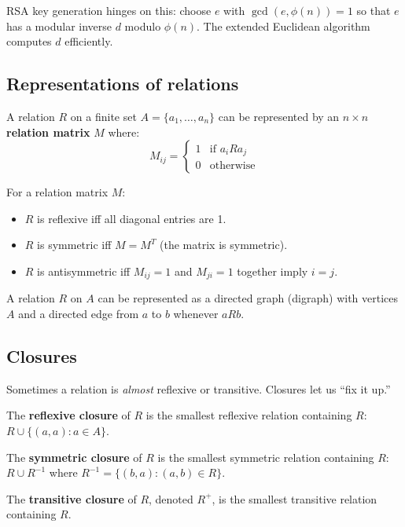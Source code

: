 \begin{remark}
RSA key generation hinges on this: choose $e$ with $\gcd(e,\phi(n)) = 1$ so that $e$ has a modular inverse $d$ modulo $\phi(n)$. The extended Euclidean algorithm computes $d$ efficiently.
\end{remark}

\subsection*{Representations of relations}

\begin{definition}
A relation $R$ on a finite set $A = \{a_1, \ldots, a_n\}$ can be represented by an $n \times n$ \textbf{relation matrix} $M$ where:
\[
M_{ij} = \begin{cases} 1 & \text{if } a_i R a_j \\ 0 & \text{otherwise} \end{cases}
\]
\end{definition}

\begin{proposition}
For a relation matrix $M$:
\begin{itemize}
  \item $R$ is reflexive iff all diagonal entries are 1.
  \item $R$ is symmetric iff $M = M^T$ (the matrix is symmetric).
  \item $R$ is antisymmetric iff $M_{ij} = 1$ and $M_{ji} = 1$ together imply $i = j$.
\end{itemize}
\end{proposition}

\begin{definition}
A relation $R$ on $A$ can be represented as a directed graph (digraph) with vertices $A$ and a directed edge from $a$ to $b$ whenever $aRb$.
\end{definition}

\subsection*{Closures}

Sometimes a relation is \emph{almost} reflexive or transitive. Closures let us ``fix it up.''

\begin{definition}[Closure]
The \textbf{reflexive closure} of $R$ is the smallest reflexive relation containing $R$: $R \cup \{(a,a) : a \in A\}$.

The \textbf{symmetric closure} of $R$ is the smallest symmetric relation containing $R$: $R \cup R^{-1}$ where $R^{-1} = \{(b,a) : (a,b) \in R\}$.

The \textbf{transitive closure} of $R$, denoted $R^+$, is the smallest transitive relation containing $R$.
\end{definition}

